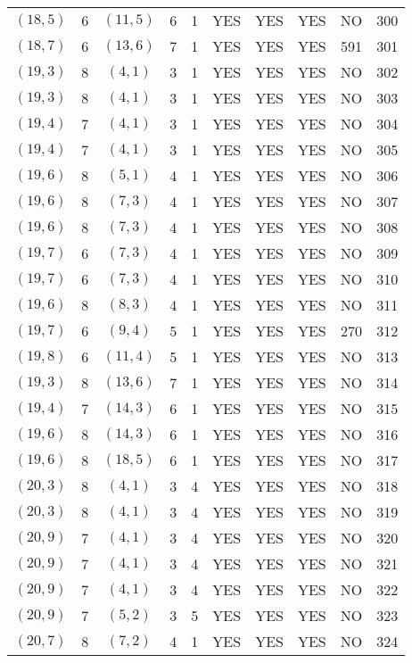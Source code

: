 \begin{longtable}{|c|c|c|c|c|c|c|c|c|c|}
$(18, 5)$ & 6 & $(11, 5)$ & 6 & 1 & YES & YES & YES & NO & 300\\
$(18, 7)$ & 6 & $(13, 6)$ & 7 & 1 & YES & YES & YES & 591 & 301\\
$(19, 3)$ & 8 & $(4, 1)$ & 3 & 1 & YES & YES & YES & NO & 302\\
$(19, 3)$ & 8 & $(4, 1)$ & 3 & 1 & YES & YES & YES & NO & 303\\
$(19, 4)$ & 7 & $(4, 1)$ & 3 & 1 & YES & YES & YES & NO & 304\\
$(19, 4)$ & 7 & $(4, 1)$ & 3 & 1 & YES & YES & YES & NO & 305\\
$(19, 6)$ & 8 & $(5, 1)$ & 4 & 1 & YES & YES & YES & NO & 306\\
$(19, 6)$ & 8 & $(7, 3)$ & 4 & 1 & YES & YES & YES & NO & 307\\
$(19, 6)$ & 8 & $(7, 3)$ & 4 & 1 & YES & YES & YES & NO & 308\\
$(19, 7)$ & 6 & $(7, 3)$ & 4 & 1 & YES & YES & YES & NO & 309\\
$(19, 7)$ & 6 & $(7, 3)$ & 4 & 1 & YES & YES & YES & NO & 310\\
$(19, 6)$ & 8 & $(8, 3)$ & 4 & 1 & YES & YES & YES & NO & 311\\
$(19, 7)$ & 6 & $(9, 4)$ & 5 & 1 & YES & YES & YES & 270 & 312\\
$(19, 8)$ & 6 & $(11, 4)$ & 5 & 1 & YES & YES & YES & NO & 313\\
$(19, 3)$ & 8 & $(13, 6)$ & 7 & 1 & YES & YES & YES & NO & 314\\
$(19, 4)$ & 7 & $(14, 3)$ & 6 & 1 & YES & YES & YES & NO & 315\\
$(19, 6)$ & 8 & $(14, 3)$ & 6 & 1 & YES & YES & YES & NO & 316\\
$(19, 6)$ & 8 & $(18, 5)$ & 6 & 1 & YES & YES & YES & NO & 317\\
$(20, 3)$ & 8 & $(4, 1)$ & 3 & 4 & YES & YES & YES & NO & 318\\
$(20, 3)$ & 8 & $(4, 1)$ & 3 & 4 & YES & YES & YES & NO & 319\\
$(20, 9)$ & 7 & $(4, 1)$ & 3 & 4 & YES & YES & YES & NO & 320\\
$(20, 9)$ & 7 & $(4, 1)$ & 3 & 4 & YES & YES & YES & NO & 321\\
$(20, 9)$ & 7 & $(4, 1)$ & 3 & 4 & YES & YES & YES & NO & 322\\
$(20, 9)$ & 7 & $(5, 2)$ & 3 & 5 & YES & YES & YES & NO & 323\\
$(20, 7)$ & 8 & $(7, 2)$ & 4 & 1 & YES & YES & YES & NO & 324\\

\end{longtable}
